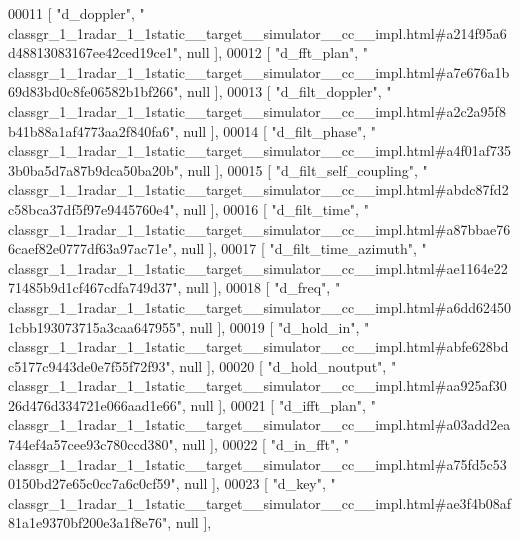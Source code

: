 \begin{DoxyCode}
00011     [ \textcolor{stringliteral}{"d\_doppler"}, \textcolor{stringliteral}{"
      classgr\_1\_1radar\_1\_1static\_\_target\_\_simulator\_\_cc\_\_impl.html#a214f95a6d48813083167ee42ced19ce1"}, null ],
00012     [ \textcolor{stringliteral}{"d\_fft\_plan"}, \textcolor{stringliteral}{"
      classgr\_1\_1radar\_1\_1static\_\_target\_\_simulator\_\_cc\_\_impl.html#a7e676a1b69d83bd0c8fe06582b1bf266"}, null ],
00013     [ \textcolor{stringliteral}{"d\_filt\_doppler"}, \textcolor{stringliteral}{"
      classgr\_1\_1radar\_1\_1static\_\_target\_\_simulator\_\_cc\_\_impl.html#a2c2a95f8b41b88a1af4773aa2f840fa6"}, null ],
00014     [ \textcolor{stringliteral}{"d\_filt\_phase"}, \textcolor{stringliteral}{"
      classgr\_1\_1radar\_1\_1static\_\_target\_\_simulator\_\_cc\_\_impl.html#a4f01af7353b0ba5d7a87b9dca50ba20b"}, null ],
00015     [ \textcolor{stringliteral}{"d\_filt\_self\_coupling"}, \textcolor{stringliteral}{"
      classgr\_1\_1radar\_1\_1static\_\_target\_\_simulator\_\_cc\_\_impl.html#abdc87fd2c58bca37df5f97e9445760e4"}, null ],
00016     [ \textcolor{stringliteral}{"d\_filt\_time"}, \textcolor{stringliteral}{"
      classgr\_1\_1radar\_1\_1static\_\_target\_\_simulator\_\_cc\_\_impl.html#a87bbae766caef82e0777df63a97ac71e"}, null ],
00017     [ \textcolor{stringliteral}{"d\_filt\_time\_azimuth"}, \textcolor{stringliteral}{"
      classgr\_1\_1radar\_1\_1static\_\_target\_\_simulator\_\_cc\_\_impl.html#ae1164e2271485b9d1cf467cdfa749d37"}, null ],
00018     [ \textcolor{stringliteral}{"d\_freq"}, \textcolor{stringliteral}{"
      classgr\_1\_1radar\_1\_1static\_\_target\_\_simulator\_\_cc\_\_impl.html#a6dd624501cbb193073715a3caa647955"}, null ],
00019     [ \textcolor{stringliteral}{"d\_hold\_in"}, \textcolor{stringliteral}{"
      classgr\_1\_1radar\_1\_1static\_\_target\_\_simulator\_\_cc\_\_impl.html#abfe628bdc5177c9443de0e7f55f72f93"}, null ],
00020     [ \textcolor{stringliteral}{"d\_hold\_noutput"}, \textcolor{stringliteral}{"
      classgr\_1\_1radar\_1\_1static\_\_target\_\_simulator\_\_cc\_\_impl.html#aa925af3026d476d334721e066aad1e66"}, null ],
00021     [ \textcolor{stringliteral}{"d\_ifft\_plan"}, \textcolor{stringliteral}{"
      classgr\_1\_1radar\_1\_1static\_\_target\_\_simulator\_\_cc\_\_impl.html#a03add2ea744ef4a57cee93c780ccd380"}, null ],
00022     [ \textcolor{stringliteral}{"d\_in\_fft"}, \textcolor{stringliteral}{"
      classgr\_1\_1radar\_1\_1static\_\_target\_\_simulator\_\_cc\_\_impl.html#a75fd5c530150bd27e65c0cc7a6c0cf59"}, null ],
00023     [ \textcolor{stringliteral}{"d\_key"}, \textcolor{stringliteral}{"
      classgr\_1\_1radar\_1\_1static\_\_target\_\_simulator\_\_cc\_\_impl.html#ae3f4b08af81a1e9370bf200e3a1f8e76"}, null ],

\end{DoxyCode}
